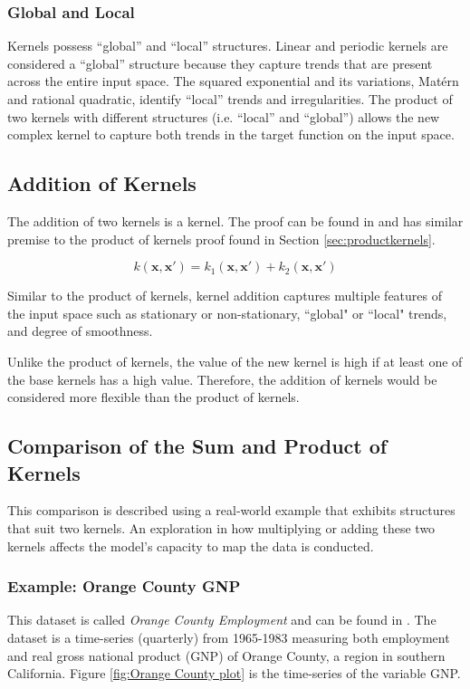 \documentclass[12pt,a4paper]{article}
\begin{document}
\subsubsection{Global and Local}
Kernels possess ``global'' and ``local'' structures. Linear and periodic kernels are considered a ``global'' structure because they capture trends that are present across the entire input space. The squared exponential and its variations, Mat\'{e}rn and rational quadratic, identify ``local'' trends and irregularities. The product of two kernels with different structures (i.e. ``local'' and ``global'') allows the new complex kernel to capture both trends in the target function on the input space. 

\subsection{Addition of Kernels}
\label{sec:add kernels}
The addition of two kernels is a kernel. The proof can be found in \citet[pp.~95]{williams2006gaussian} and has similar premise to the product of kernels proof found in Section \ref{sec:productkernels}.

\begin{equation}
k(\bm{\mathbf{x}},\bm{\mathbf{x'}}) = k_1(\bm{\mathbf{x}},\bm{\mathbf{x'}}) + k_2(\bm{\mathbf{x}},\bm{\mathbf{x'}})
\end{equation}

Similar to the product of kernels, kernel addition captures multiple features of the input space such as stationary or non-stationary, ``global" or ``local" trends, and degree of smoothness.  

Unlike the product of kernels, the value of the new kernel is high if at least one of the base kernels has a high value. Therefore, the addition of kernels would be considered more flexible than the product of kernels. 

\subsection{Comparison of the Sum and Product of Kernels}
\label{sec:comparison}
This comparison is described using a real-world example that exhibits structures that suit two kernels. An exploration in how multiplying or adding these two kernels affects the model's capacity to map the data is conducted.

\subsubsection{Example: Orange County GNP}
\label{sec:Example: Orange County GNP}
This dataset is called \textit{Orange County Employment} and can be found in \citet{baltagi2008econometric}. The dataset is a time-series (quarterly) from 1965-1983 measuring both employment and real gross national product (GNP) of Orange County, a region in southern California. Figure \ref{fig:Orange County plot} is the time-series of the variable GNP. 
\end{document}
